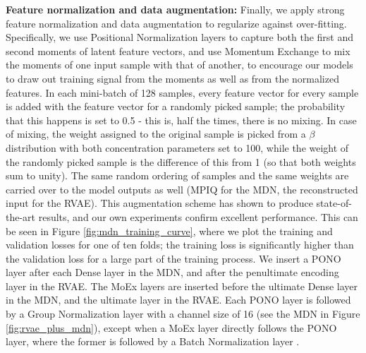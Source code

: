 {\bf Feature normalization and data augmentation:} Finally, we apply strong feature normalization and data augmentation to regularize against over-fitting. Specifically, we use Positional Normalization \citep[PONO]{positional_normalization_pono} layers to capture both the first and second moments of latent feature vectors, and use Momentum Exchange \citep[MoEx]{moex} to mix the moments of one input sample with that of another, to encourage our models to draw out training signal from the moments as well as from the normalized features. In each mini-batch of 128 samples, every feature vector for every sample is added with the feature vector for a randomly picked sample; the probability that this happens is set to 0.5 - this is, half the times, there is no mixing. In case of mixing, the weight assigned to the original sample is picked from a $\beta$ distribution with both concentration parameters set to 100, while the weight of the randomly picked sample is the difference of this from 1 (so that both weights sum to unity). The same random ordering of samples and the same weights are carried over to the model outputs as well (MPIQ for the MDN, the reconstructed input for the RVAE). This augmentation scheme has shown to produce state-of-the-art results, and our own experiments confirm excellent performance. This can be seen in Figure \ref{fig:mdn_training_curve}, where we plot the training and validation losses for one of ten folds; the training loss is significantly higher than the validation loss for a large part of the training process. We insert a PONO layer after each Dense layer in the MDN, and after the penultimate encoding layer in the RVAE. The MoEx layers are inserted before the ultimate Dense layer in the MDN, and the ultimate layer in the RVAE. Each PONO layer is followed by a Group Normalization layer \citep[GN]{group_normalization} with a channel size of 16 (see the MDN in Figure \ref{fig:rvae_plus_mdn}), except when a MoEx layer directly follows the PONO layer, where the former is followed by a Batch Normalization layer \citep{batchnorm}.

